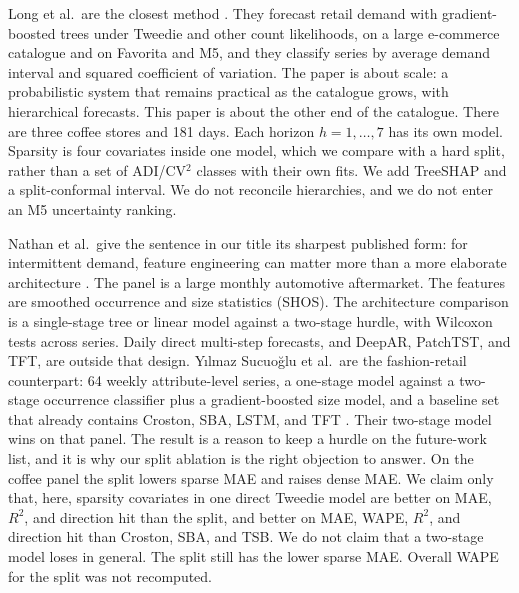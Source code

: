 \documentclass[review,authoryear]{elsarticle}
\begin{document}
Long et al.\ are the closest method \citep{long2025ijpe}. They forecast retail demand with gradient-boosted trees under Tweedie and other count likelihoods, on a large e-commerce catalogue and on Favorita and M5, and they classify series by average demand interval and squared coefficient of variation. The paper is about scale: a probabilistic system that remains practical as the catalogue grows, with hierarchical forecasts. This paper is about the other end of the catalogue. There are three coffee stores and 181 days. Each horizon $h = 1,\ldots,7$ has its own model. Sparsity is four covariates inside one model, which we compare with a hard split, rather than a set of ADI/CV$^{2}$ classes with their own fits. We add TreeSHAP and a split-conformal interval. We do not reconcile hierarchies, and we do not enter an M5 uncertainty ranking.

Nathan et al.\ give the sentence in our title its sharpest published form: for intermittent demand, feature engineering can matter more than a more elaborate architecture \citep{nathan2026scirep}. The panel is a large monthly automotive aftermarket. The features are smoothed occurrence and size statistics (SHOS). The architecture comparison is a single-stage tree or linear model against a two-stage hurdle, with Wilcoxon tests across series. Daily direct multi-step forecasts, and DeepAR, PatchTST, and TFT, are outside that design. Y{\i}lmaz Sucuo{\u{g}}lu et al.\ are the fashion-retail counterpart: 64 weekly attribute-level series, a one-stage model against a two-stage occurrence classifier plus a gradient-boosted size model, and a baseline set that already contains Croston, SBA, LSTM, and TFT \citep{yilmaz2026fashion}. Their two-stage model wins on that panel. The result is a reason to keep a hurdle on the future-work list, and it is why our split ablation is the right objection to answer. On the coffee panel the split lowers sparse MAE and raises dense MAE. We claim only that, here, sparsity covariates in one direct Tweedie model are better on MAE, $R^{2}$, and direction hit than the split, and better on MAE, WAPE, $R^{2}$, and direction hit than Croston, SBA, and TSB. We do not claim that a two-stage model loses in general. The split still has the lower sparse MAE. Overall WAPE for the split was not recomputed.
\end{document}
